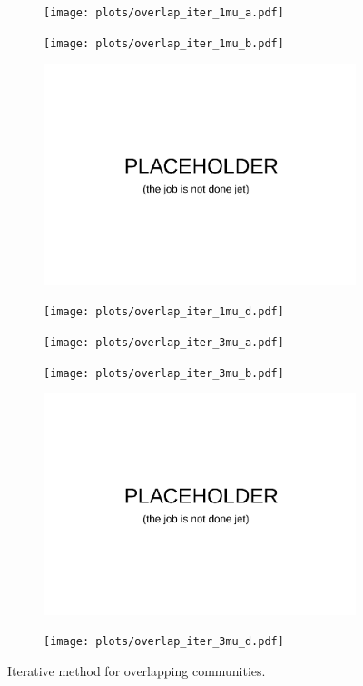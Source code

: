 \begin{figure}
    \centering
    \begin{subfigure}{0.5\textwidth}
    \texttt{[image: plots/overlap\_iter\_1mu\_a.pdf]}
    \end{subfigure}%
    \begin{subfigure}{0.5\textwidth}
    \texttt{[image: plots/overlap\_iter\_1mu\_b.pdf]}
    \end{subfigure}
    \begin{subfigure}{0.5\textwidth}
    \includegraphics[width=0.8\linewidth]{plots/placeholder.pdf}
    \end{subfigure}%
    \begin{subfigure}{0.5\textwidth}
    \texttt{[image: plots/overlap\_iter\_1mu\_d.pdf]}
    \end{subfigure}
    \begin{subfigure}{0.5\textwidth}
    \texttt{[image: plots/overlap\_iter\_3mu\_a.pdf]}
    \end{subfigure}%
    \begin{subfigure}{0.5\textwidth}
    \texttt{[image: plots/overlap\_iter\_3mu\_b.pdf]}
    \end{subfigure}
    \begin{subfigure}{0.5\textwidth}
    \includegraphics[width=0.8\linewidth]{plots/placeholder.pdf}
    \end{subfigure}%
    \begin{subfigure}{0.5\textwidth}
    \texttt{[image: plots/overlap\_iter\_3mu\_d.pdf]}
    \end{subfigure}
    \caption{Iterative method for overlapping communities.}
\end{figure}

